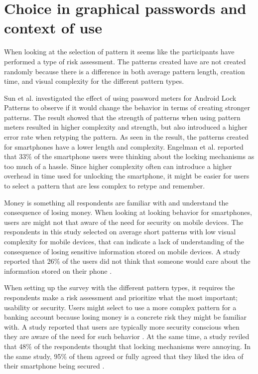   \section{Choice in graphical passwords and context of use}
    
    When looking at the selection of pattern it seems like the participants have performed a type of risk assessment. The patterns created have are not created randomly because there is a difference in both average pattern length, creation time, and visual complexity for the different pattern types.

    Sun et al. \cite{Sun} investigated the effect of using password meters for Android Lock Patterns to observe if it would change the behavior in terms of creating stronger patterns. The result showed that the strength of patterns when using pattern meters resulted in higher complexity and strength, but also introduced a higher error rate when retyping the pattern. As seen in the result, the patterns created for smartphones have a lower length and complexity. Engelman et al. \cite{Egelman} reported that 33\% of the smartphone users were thinking about the locking mechanisms as too much of a hassle. Since higher complexity often can introduce a higher overhead in time used for unlocking the smartphone, it might be easier for users to select a pattern that are less complex to retype and remember.   

    Money is something all respondents are familiar with and understand the consequence of losing money. When looking at looking behavior for smartphones, users are might not that aware of the need for security on mobile devices. The respondents in this study selected on average short patterns with low visual complexity for mobile devices, that can indicate a lack of understanding of the consequence of losing sensitive information stored on mobile devices. A study reported that 26\% of the users did not think that someone would care about the information stored on their phone \cite{Egelman}. 

    When setting up the survey with the different pattern types, it requires the respondents make a risk assessment and prioritize what the most important; usability or security. Users might select to use a more complex pattern for a banking account because losing money is a concrete risk they might be familiar with. A study reported that users are typically more security conscious when they are aware of the need for such behavior \cite{Sasse}. At the same time, a study reviled that 48\% of the respondents thought that locking mechanisms were annoying. In the same study, 95\% of them agreed or fully agreed that they liked the idea of their smartphone being secured \cite{habits3}. 

